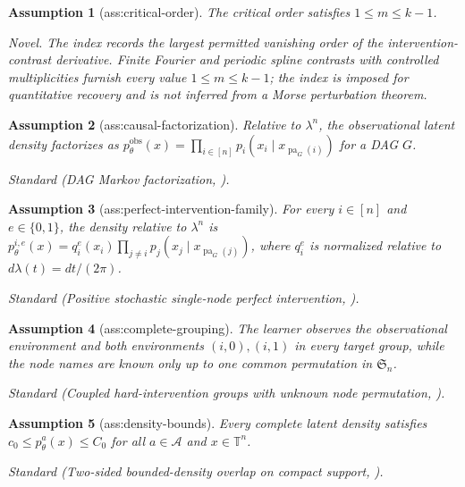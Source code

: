 \documentclass{article}
\newtheorem{assumption}{Assumption}
\begin{document}
\begin{assumption}[ass:critical-order]\label{ass:critical-order}
The critical order satisfies \(1\le m\le k-1\).
\par\smallskip\noindent\emph{Novel.} The index records the largest permitted vanishing order of the intervention-contrast derivative. Finite Fourier and periodic spline contrasts with controlled multiplicities furnish every value \(1\le m\le k-1\); the index is imposed for quantitative recovery and is not inferred from a Morse perturbation theorem.
\end{assumption}

\begin{assumption}[ass:causal-factorization]\label{ass:causal-factorization}
Relative to \(\lambda^n\), the observational latent density factorizes as \(p_\theta^{\mathrm{obs}}(x)=\prod_{i\in[n]}p_i(x_i\mid x_{\operatorname{pa}_G(i)})\) for a DAG \(G\).
\par\smallskip\noindent\emph{Standard} (DAG Markov factorization, \cite{LiangEtAl2023CauCA}).
\end{assumption}

\begin{assumption}[ass:perfect-intervention-family]\label{ass:perfect-intervention-family}
For every \(i\in[n]\) and \(e\in\{0,1\}\), the density relative to \(\lambda^n\) is \(p_\theta^{i,e}(x)=q_i^e(x_i)\prod_{j\ne i}p_j(x_j\mid x_{\operatorname{pa}_G(j)})\), where \(q_i^e\) is normalized relative to \(d\lambda(t)=dt/(2\pi)\).
\par\smallskip\noindent\emph{Standard} (Positive stochastic single-node perfect intervention, \cite{LiangEtAl2023CauCA}).
\end{assumption}

\begin{assumption}[ass:complete-grouping]\label{ass:complete-grouping}
The learner observes the observational environment and both environments \((i,0),(i,1)\) in every target group, while the node names are known only up to one common permutation in \(\mathfrak S_n\).
\par\smallskip\noindent\emph{Standard} (Coupled hard-intervention groups with unknown node permutation, \cite{VariciEtAl2025ScoreCRL}).
\end{assumption}

\begin{assumption}[ass:density-bounds]\label{ass:density-bounds}
Every complete latent density satisfies \(c_0\le p_\theta^a(x)\le C_0\) for all \(a\in\mathcal A\) and \(x\in\mathbb T^n\).
\par\smallskip\noindent\emph{Standard} (Two-sided bounded-density overlap on compact support, \cite{BuchholzScholkopf2025Robustness}).
\end{assumption}
\end{document}
